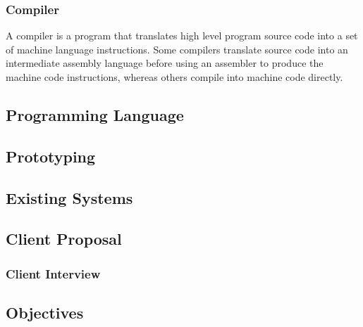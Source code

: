 \subsubsection{Compiler}
\label{sec:Compiler}
A compiler is a program that translates high level program source code into a set of machine language instructions. Some compilers translate source code into an intermediate assembly language before using an assembler to produce the machine code instructions, whereas others compile into machine code directly.

\subsection{Programming Language}
\subsection{Prototyping}
\subsection{Existing Systems}
\subsection{Client Proposal}
\subsubsection{Client Interview}
\subsection{Objectives}